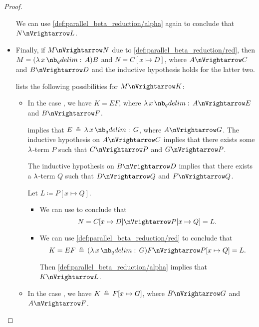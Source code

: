 \begin{proof}
\begin{itemize}
    We can use \ref{def:parallel_beta_reduction/alpha} again to conclude that \( N \pred L \).

    \item Finally, if \( M \pred N \) due to \ref{def:parallel_beta_reduction/red}, then \( M = (\qabs x A)B \) and \( N = C[x \mapsto D] \), where \( A \pred C \) and \( B \pred D \) and the inductive hypothesis holds for the latter two.

     lists the following possibilities for \( M \pred K \):
    \begin{itemize}
      \item In the case , we have \( K = EF \), where \( \qabs x A \pred E \) and \( B \pred F \).

       implies that \( E \aequiv \qabs x G \), where \( A \pred G \). The inductive hypothesis on \( A \pred C \) implies that there exists some \( \mathrm{\lambda} \)-term \( P \) such that \( C \pred P \) and \( G \pred P \).

      The inductive hypothesis on \( B \pred D \) implies that there exists a \( \mathrm{\lambda} \)-term \( Q \) such that \( D \pred Q \) and \( F \pred Q \).

      Let \( L \coloneqq P[x \mapsto Q] \).
      \begin{itemize}
        \item We can use  to conclude that
        \begin{equation*}
          N = C[x \mapsto D] \pred P[x \mapsto Q] = L.
        \end{equation*}

        \item We can use \ref{def:parallel_beta_reduction/red} to conclude that
        \begin{equation*}
          K = EF \aequiv (\qabs x G) F \pred P[x \mapsto Q] = L.
        \end{equation*}

        Then \ref{def:parallel_beta_reduction/alpha} implies that \( K \pred L \).
      \end{itemize}

      \item In the case , we have \( K \aequiv F[x \mapsto G] \), where \( B \pred G \) and \( A \pred F \).


\end{itemize}
\end{itemize}
\end{proof}

